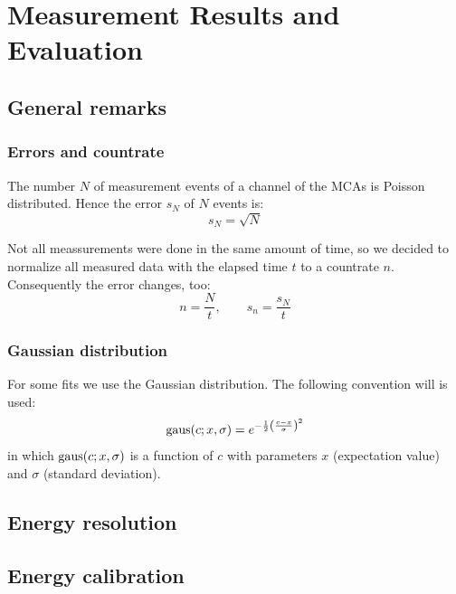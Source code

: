 \section{Measurement Results and Evaluation}

\subsection{General remarks}
\subsubsection{Errors and countrate}
The number $N$ of measurement events of a channel of the MCAs is Poisson distributed. Hence the error $s_N$  of $N$ events is:
\begin{equation}
  s_N = \sqrt{N}
\end{equation}

Not all meassurements were done in the same amount of time, so we decided to normalize all measured data with the elapsed time $t$ to a 
countrate $n$. Consequently the error changes, too:
\begin{equation}
    n = \frac{N}{t}, \qquad s_n = \frac{s_N}{t}
\end{equation}
\subsubsection{Gaussian distribution}
For some fits we use the Gaussian distribution. The following convention will is used:
\begin{equation}
	\label{eq:gaus}
    \operatorname{gaus}(c;x,\sigma) = e^{-\frac{1}{2} \left( \frac{c-x}{\sigma} \right)^2}
\end{equation}
in which $\operatorname{gaus}(c;x,\sigma)$ is a function of $c$ with parameters $x$ (expectation value) and $\sigma$ (standard deviation).

\subsection{Energy resolution}

\subsection{Energy calibration}
